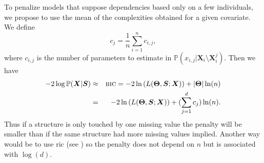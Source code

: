 \documentclass[12pt,a4paper]{report}
\begin{document}
			To penalize models that suppose dependencies based only on a few individuals, we propose to use the mean of the complexities obtained for a given covariate. We define
			\begin{equation}
			c_j=\frac{1}{n}\sum_{i=1}^nc_{i,j},  \nonumber 
\end{equation}						where $c_{i,j}$ is the number of parameters to estimate in $\mathbb{P}(x_{i,j}|\boldsymbol{X}_i\setminus \boldsymbol{X}_i^j)$. Then we have
			\begin{eqnarray}
		-2\log \mathbb{P}(\boldsymbol{X}|\boldsymbol{S})&\approx & \mbox{{\sc bic}}=-2\ln\left(L(\boldsymbol{\Theta},\boldsymbol{S};\boldsymbol{X})\right)+|\boldsymbol{\Theta}|\ln(n) \nonumber  \\
		&=& -2\ln\left(L(\boldsymbol{\Theta},\boldsymbol{S};\boldsymbol{X})\right)+(\sum_{j=1}^dc_j)\ln(n). \nonumber 
	\end{eqnarray}
			 Thus if a structure is only touched by one missing value the penalty will be smaller than if the same structure had more missing values implied.
			Another way would be to use {\sc ric} (see \cite{foster1994risk}) so the penalty does not depend on $n$ but is associated with $\log(d)$. %
		
%	
			
%	

\end{document}
